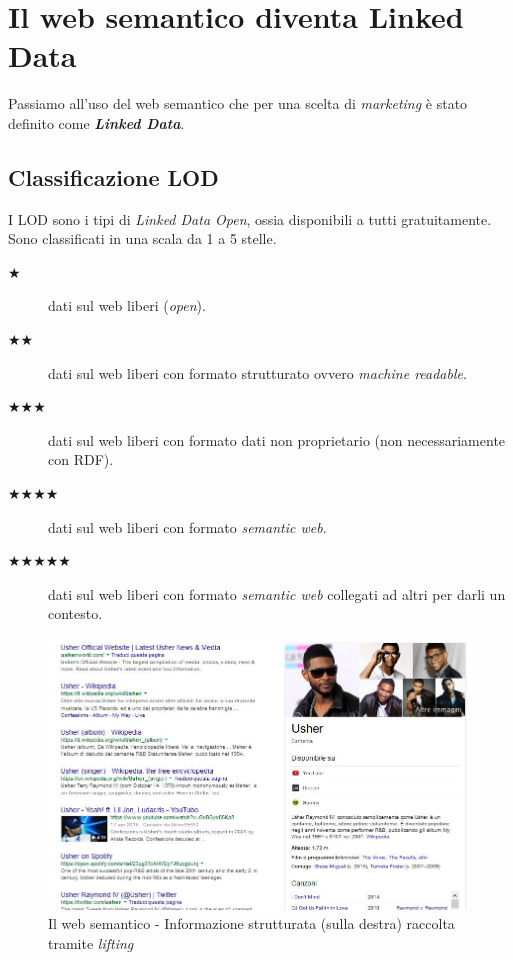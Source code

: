 	\section{Il web semantico diventa Linked Data}
		Passiamo all'uso del web semantico che per una scelta di \emph{marketing} è stato definito come \textbf{\emph{Linked Data}}.
		
		\subsection{Classificazione LOD}
			I LOD sono i tipi di \emph{Linked Data Open}, ossia disponibili a tutti gratuitamente. Sono classificati in una scala da 1 a 5 stelle.
			\begin{description}
				\item[$\bigstar$] dati sul web liberi (\emph{open}).
				\item[$\bigstar \bigstar$] dati sul web liberi con formato strutturato ovvero \emph{machine readable}.
				\item[$\bigstar \bigstar \bigstar$] dati sul web liberi con formato dati non proprietario (non necessariamente con RDF).
				\item[$\bigstar \bigstar \bigstar \bigstar$] dati sul web liberi con formato \emph{semantic web}.
				\item[$\bigstar \bigstar \bigstar \bigstar \bigstar$] dati sul web liberi con formato \emph{semantic web} collegati ad altri per darli un contesto.
			\end{description}
			
			\begin{figure}
				\centering
				\includegraphics[width=\textwidth]{images/LInformazioneEIlWebSemantico-IlCasoUsher}
				\caption{Il web semantico - Informazione strutturata (sulla destra) raccolta tramite \emph{lifting}}
				\label{fig:LInformazioneEIlWebSemantico-IlCasoUsher}
			\end{figure}
			
